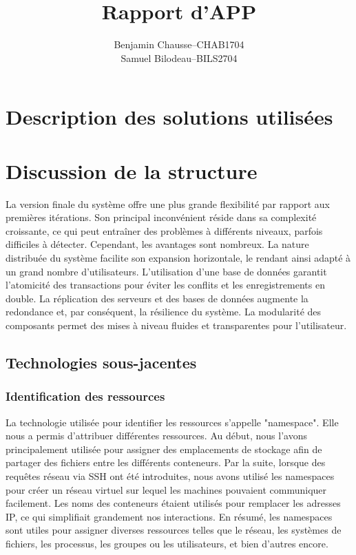 \documentclass[a11paper, 11pt]{article}
\title{Rapport d'APP}
\author{
  \addtolength{\tabcolsep}{-0.4em}
  \begin{tabular}{rcl} %
  Benjamin Chausse & -- & CHAB1704 \\
  Samuel Bilodeau  & -- & BILS2704 \\
  \end{tabular}
}
\begin{document}
\maketitle
\newpage
\tableofcontents
\newpage

\section{Description des solutions utilisées}

\section{Discussion de la structure}

La version finale du système offre une plus grande flexibilité par rapport aux premières itérations. Son principal inconvénient réside dans sa complexité croissante, ce qui peut entraîner des problèmes à différents niveaux, parfois difficiles à détecter. Cependant, les avantages sont nombreux. La nature distribuée du système facilite son expansion horizontale, le rendant ainsi adapté à un grand nombre d'utilisateurs. L'utilisation d'une base de données garantit l'atomicité des transactions pour éviter les conflits et les enregistrements en double. La réplication des serveurs et des bases de données augmente la redondance et, par conséquent, la résilience du système. La modularité des composants permet des mises à niveau fluides et transparentes pour l'utilisateur.

\subsection{Technologies sous-jacentes}

\subsubsection{Identification des ressources}

La technologie utilisée pour identifier les ressources s'appelle "namespace". Elle nous a permis d'attribuer différentes ressources. Au début, nous l'avons principalement utilisée pour assigner des emplacements de stockage afin de partager des fichiers entre les différents conteneurs. Par la suite, lorsque des requêtes réseau via SSH ont été introduites, nous avons utilisé les namespaces pour créer un réseau virtuel sur lequel les machines pouvaient communiquer facilement. Les noms des conteneurs étaient utilisés pour remplacer les adresses IP, ce qui simplifiait grandement nos interactions. En résumé, les namespaces sont utiles pour assigner diverses ressources telles que le réseau, les systèmes de fichiers, les processus, les groupes ou les utilisateurs, et bien d'autres encore.
\end{document}
